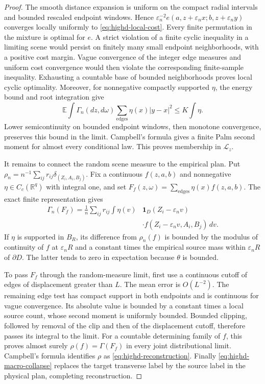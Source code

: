 \documentclass[11pt,reqno]{amsart}
\theoremstyle{definition}
\theoremstyle{remark}
\numberwithin{equation}{section}
\newcommand{\R}{\mathbb R}
\newcommand{\E}{\mathbb E}
\begin{document}
\begin{proof}
The smooth distance expansion is uniform on the compact radial
intervals and bounded rescaled endpoint windows. Hence
\(\varepsilon_n^{-2}e(a,z+\varepsilon_nx;
b,z+\varepsilon_ny)\) converges locally uniformly to
\eqref{eq:highd-local-cost}. Every finite permutation in the mixture
is optimal for \(e\). A strict violation of a finite cyclic inequality
in a limiting scene would persist on finitely many small endpoint
neighborhoods, with a positive cost margin. Vague convergence of the
integer edge measures and uniform cost convergence would then violate
the corresponding finite-sample inequality. Exhausting a countable
base of bounded neighborhoods proves local cyclic optimality.
Moreover, for nonnegative compactly supported \(\eta\), the energy
bound and root integration give
\[
\E\int\Gamma_n(dz,d\omega)
 \sum_{\text{edges}}\eta(x)|y-x|^2\le K\int\eta.
\]
Lower semicontinuity on bounded endpoint windows, then monotone
convergence, preserves this bound in the limit. Campbell's formula
gives a finite Palm second moment for almost every conditional law.
This proves membership in \(\mathcal L_z\).

It remains to connect the random scene measure to the empirical plan.
Put \(\rho_n=n^{-1}\sum_{ij}r_{ij}\delta_{(Z_i,A_i,B_j)}\).
Fix a continuous \(f(z,a,b)\) and nonnegative \(\eta\in C_c(\R^q)\)
with integral one, and set
\(F_f(z,\omega)=\sum_{\text{edges}}\eta(x)f(z,a,b)\).
The exact finite representation gives
\begin{align*}
\Gamma_n(F_f)=\frac1n\sum_{ij}r_{ij}\int\eta(v)
 &\mathbf1_D(Z_i-\varepsilon_nv)\\
 &\cdot f(Z_i-\varepsilon_nv,A_i,B_j)\,dv.
\end{align*}
If \(\eta\) is supported in \(B_R\), its difference from
\(\rho_n(f)\) is bounded by the modulus of continuity of \(f\)
at \(\varepsilon_nR\) and a constant times the empirical source
mass within \(\varepsilon_nR\) of \(\partial D\). The latter
tends to zero in expectation because \(\theta\) is bounded.

To pass \(F_f\) through the random-measure limit, first use a continuous cutoff of
edges of displacement greater than \(L\). The mean error is
\(O(L^{-2})\). The remaining edge test has compact support in both
endpoints and is continuous for vague convergence. Its absolute value
is bounded by a constant times a local source count, whose second
moment is uniformly bounded. Bounded clipping, followed by removal
of the clip and then of the displacement cutoff, therefore passes
its integral to the limit. For a countable determining family of
\(f\), this proves almost surely
\(\rho(f)=\Gamma(F_f)\) in every joint distributional limit.
Campbell's formula identifies \(\rho\) as
\eqref{eq:highd-reconstruction}. Finally
\eqref{eq:highd-macro-collapse} replaces the target transverse label
by the source label in the physical plan, completing reconstruction.
\end{proof}
\end{document}
